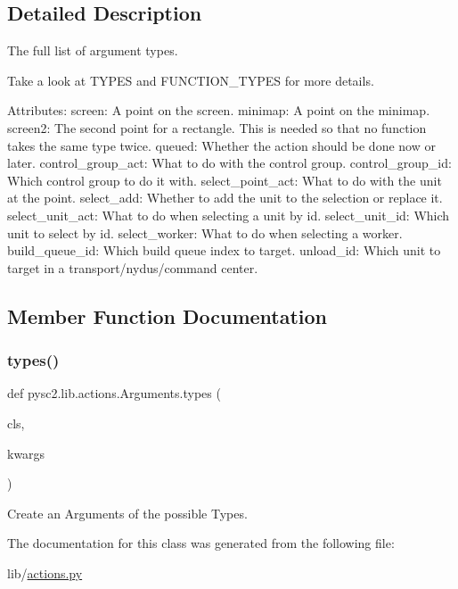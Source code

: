 \subsection{Detailed Description}
\begin{DoxyVerb}The full list of argument types.

Take a look at TYPES and FUNCTION_TYPES for more details.

Attributes:
  screen: A point on the screen.
  minimap: A point on the minimap.
  screen2: The second point for a rectangle. This is needed so that no
      function takes the same type twice.
  queued: Whether the action should be done now or later.
  control_group_act: What to do with the control group.
  control_group_id: Which control group to do it with.
  select_point_act: What to do with the unit at the point.
  select_add: Whether to add the unit to the selection or replace it.
  select_unit_act: What to do when selecting a unit by id.
  select_unit_id: Which unit to select by id.
  select_worker: What to do when selecting a worker.
  build_queue_id: Which build queue index to target.
  unload_id: Which unit to target in a transport/nydus/command center.
\end{DoxyVerb}
 

\subsection{Member Function Documentation}
\mbox{\label{classpysc2_1_1lib_1_1actions_1_1_arguments_ab78c631c19bfc340e35069612a5b1f22}} 
\subsubsection{\texorpdfstring{types()}{types()}}
{\footnotesize\ttfamily def pysc2.\+lib.\+actions.\+Arguments.\+types (\begin{DoxyParamCaption}\item[{}]{cls,  }\item[{}]{kwargs }\end{DoxyParamCaption})}

\begin{DoxyVerb}Create an Arguments of the possible Types.\end{DoxyVerb}
 

The documentation for this class was generated from the following file\+:\begin{DoxyCompactItemize}
\item 
lib/\mbox{\hyperlink{actions_8py}{actions.\+py}}\end{DoxyCompactItemize}
